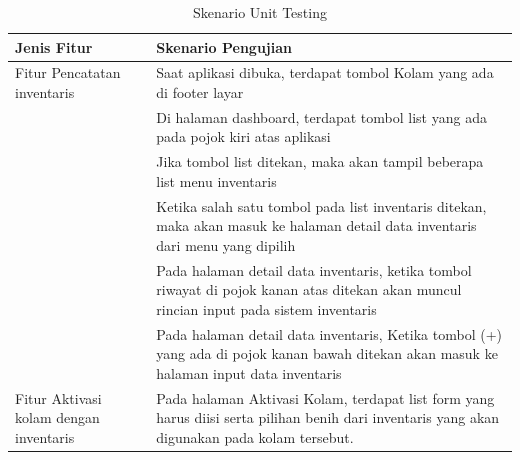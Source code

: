\begin{spacing}{1.5}
\begin{enumerate}
	\begin{table}[H]	
		\begin{center}
			\caption{Skenario Unit Testing}
			\label{tab:table8}
			\begin{tabular}{|m{13em}|m{17em}|}
			\hline
			\textbf{Jenis Fitur} & \textbf{Skenario Pengujian} \\
			\hline
			Fitur Pencatatan inventaris & Saat aplikasi dibuka, terdapat tombol Kolam yang ada di footer layar \\
			\hline
			 & Di halaman dashboard, terdapat tombol list yang ada pada pojok kiri atas aplikasi \\
			\hline
			 & Jika tombol list ditekan, maka akan tampil beberapa list menu inventaris \\
			\hline
			& Ketika salah satu tombol pada list inventaris ditekan, maka akan masuk ke halaman detail data inventaris dari menu yang dipilih \\
			\hline
			& Pada halaman detail data inventaris, ketika tombol riwayat di pojok kanan atas ditekan akan muncul rincian input pada sistem inventaris \\
			\hline
			& Pada halaman detail data inventaris, Ketika tombol (+) yang ada di pojok kanan bawah ditekan akan masuk ke halaman input data inventaris \\
			\hline
			Fitur Aktivasi kolam dengan inventaris & Pada halaman Aktivasi Kolam, terdapat list form yang harus diisi serta pilihan benih dari inventaris yang akan digunakan pada kolam tersebut.\\
			\hline
			\end{tabular}
		\end{center}
	\end{table}


\end{enumerate}
\end{spacing}
